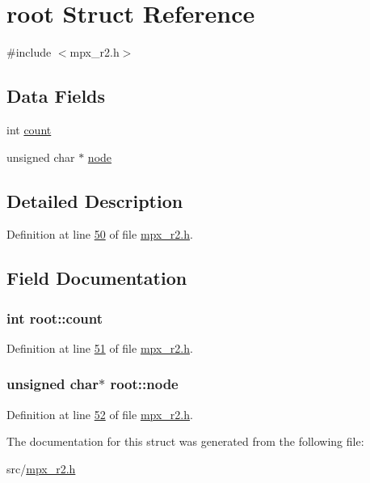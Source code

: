 \hypertarget{structroot}{
\section{root Struct Reference}
\label{structroot}
}


{\ttfamily \#include $<$mpx\_\-r2.h$>$}

\subsection*{Data Fields}
\begin{DoxyCompactItemize}
\item 
int \hyperlink{structroot_afa78d0408d4af29e936332a04739d59c}{count}
\item 
unsigned char $\ast$ \hyperlink{structroot_acf8c9d6dbd37a892a1b45394c1595f1a}{node}
\end{DoxyCompactItemize}


\subsection{Detailed Description}


Definition at line \hyperlink{mpx__r2_8h_source_l00050}{50} of file \hyperlink{mpx__r2_8h_source}{mpx\_\-r2.h}.



\subsection{Field Documentation}
\hypertarget{structroot_afa78d0408d4af29e936332a04739d59c}{
\subsubsection[{count}]{\setlength{\rightskip}{0pt plus 5cm}int {\bf root::count}}}
\label{structroot_afa78d0408d4af29e936332a04739d59c}


Definition at line \hyperlink{mpx__r2_8h_source_l00051}{51} of file \hyperlink{mpx__r2_8h_source}{mpx\_\-r2.h}.

\hypertarget{structroot_acf8c9d6dbd37a892a1b45394c1595f1a}{
\subsubsection[{node}]{\setlength{\rightskip}{0pt plus 5cm}unsigned char$\ast$ {\bf root::node}}}
\label{structroot_acf8c9d6dbd37a892a1b45394c1595f1a}


Definition at line \hyperlink{mpx__r2_8h_source_l00052}{52} of file \hyperlink{mpx__r2_8h_source}{mpx\_\-r2.h}.



The documentation for this struct was generated from the following file:\begin{DoxyCompactItemize}
\item 
src/\hyperlink{mpx__r2_8h}{mpx\_\-r2.h}\end{DoxyCompactItemize}
